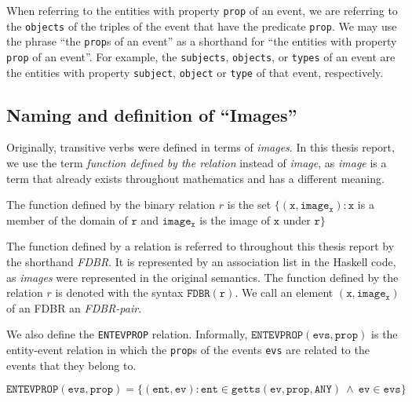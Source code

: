 \documentclass[../main.tex]{subfiles}
\begin{document}
When referring to the entities with property \texttt{prop} of an event, we are referring to the \texttt{objects} of the triples of the event that have the predicate \texttt{prop}.
We may use the phrase ``the \texttt{prop}s of an event'' as a shorthand for ``the entities with property \texttt{prop} of an event''.
For example, the \texttt{subjects}, \texttt{objects}, or \texttt{types} of an event are the entities with property \texttt{subject}, \texttt{object} or \texttt{type} of that event, respectively.

\subsection{Naming and definition of ``Images''}
\label{section:fdbr}

Originally, transitive verbs were defined in terms of {\em images}\cite{frost2014denotational}.
In this thesis report, we use the term {\em function defined by the relation} instead of {\em image}, as {\em image} is a term that already exists throughout mathematics and has
a different meaning.

\begin{definition}
	The function defined by the binary relation $r$ is the set $\{(\mathtt{x}, \mathtt{image_x}) : \mathtt{x}$ is a member of the domain of $\mathtt{r}$ and $\mathtt{image_x}$ is the image of $\mathtt{x}$ under $\mathtt{r} \}$
\end{definition}

The function defined by a relation is referred to throughout this thesis report by the shorthand {\em FDBR}.  It is represented by an association list in the Haskell code,
as {\em images} were represented in the original semantics.  The function defined by the relation $r$ is denoted with the syntax $\mathtt{FDBR}(\mathtt{r})$.
We call an element $\mathtt{(x, image_x)}$ of an FDBR an {\em FDBR-pair}.

We also define the \texttt{ENTEVPROP} relation.  Informally, $\mathtt{ENTEVPROP}(\mathtt{evs}, \mathtt{prop})$ is the entity-event relation in which the \texttt{prop}s of the events \texttt{evs} are related to the events that they belong to.

\begin{definition}
	\[\mathtt{ENTEVPROP}(\mathtt{evs}, \mathtt{prop}) = \{(\mathtt{ent}, \mathtt{ev}) : \mathtt{ent} \in \mathtt{getts}(\mathtt{ev}, \mathtt{prop}, \mathtt{ANY}) \ \wedge \ \mathtt{ev} \in \mathtt{evs} \}\]
\end{definition}
\end{document}
